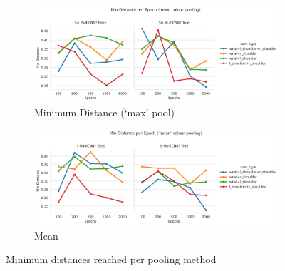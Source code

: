 \begin{figure}[htpb]
  \centering
  \begin{subfigure}{\linewidth}
    \centering
    \includegraphics[width=\linewidth]{assets/evaluation/cam-attn/ro_random-cam_attn-max-mindist.png}
    \caption{Minimum Distance (`max' pool)}\label{subfig:cam-attn-max-mindist-cnn}
  \end{subfigure}

  \begin{subfigure}{\linewidth}
    \centering
    \includegraphics[width=\linewidth]{assets/evaluation/cam-attn/ro_random-cam_attn-mean-mindist.png}
    \caption{Mean}\label{subfig:cam-attn-mean-mindist-cnn}
  \end{subfigure}
  \caption{Minimum distances reached per pooling method}\label{fig:cam-attn-mindist-cnn}
\end{figure}


